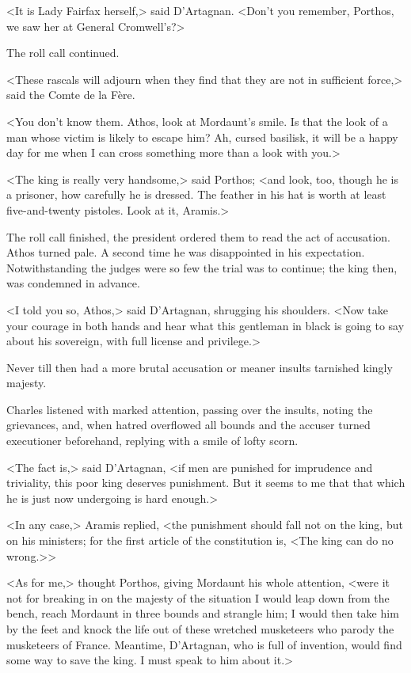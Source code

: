 <It is Lady Fairfax herself,> said D'Artagnan. <Don't you remember, Porthos, we saw her at General Cromwell's?>

The roll call continued.

<These rascals will adjourn when they find that they are not in sufficient force,> said the Comte de la Fère.

<You don't know them. Athos, look at Mordaunt's smile. Is that the look of a man whose victim is likely to escape him? Ah, cursed basilisk, it will be a happy day for me when I can cross something more than a look with you.>

<The king is really very handsome,> said Porthos; <and look, too, though he is a prisoner, how carefully he is dressed. The feather in his hat is worth at least five-and-twenty pistoles. Look at it, Aramis.>

The roll call finished, the president ordered them to read the act of accusation. Athos turned pale. A second time he was disappointed in his expectation. Notwithstanding the judges were so few the trial was to continue; the king then, was condemned in advance.

<I told you so, Athos,> said D'Artagnan, shrugging his shoulders. <Now take your courage in both hands and hear what this gentleman in black is going to say about his sovereign, with full license and privilege.>

Never till then had a more brutal accusation or meaner insults tarnished kingly majesty.

Charles listened with marked attention, passing over the insults, noting the grievances, and, when hatred overflowed all bounds and the accuser turned executioner beforehand, replying with a smile of lofty scorn.

<The fact is,> said D'Artagnan, <if men are punished for imprudence and triviality, this poor king deserves punishment. But it seems to me that that which he is just now undergoing is hard enough.>

<In any case,> Aramis replied, <the punishment should fall not on the king, but on his ministers; for the first article of the constitution is, <The king can do no wrong.>>

<As for me,> thought Porthos, giving Mordaunt his whole attention, <were it not for breaking in on the majesty of the situation I would leap down from the bench, reach Mordaunt in three bounds and strangle him; I would then take him by the feet and knock the life out of these wretched musketeers who parody the musketeers of France. Meantime, D'Artagnan, who is full of invention, would find some way to save the king. I must speak to him about it.>

